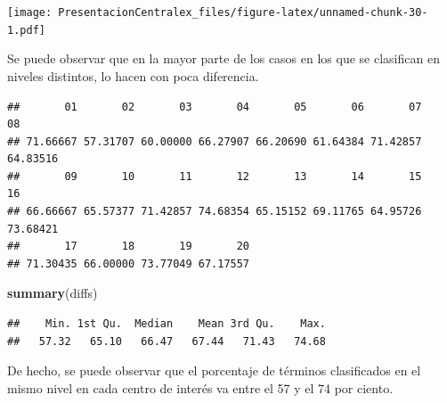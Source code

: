 \documentclass[
]{article}
\newenvironment{Shaded}{\begin{snugshade}}{\end{snugshade}}
\newcommand{\DecValTok}[1]{\textcolor[rgb]{0.00,0.00,0.81}{#1}}
\newcommand{\KeywordTok}[1]{\textcolor[rgb]{0.13,0.29,0.53}{\textbf{#1}}}
\newcommand{\NormalTok}[1]{#1}
\newcommand{\OperatorTok}[1]{\textcolor[rgb]{0.81,0.36,0.00}{\textbf{#1}}}
\newcommand{\StringTok}[1]{\textcolor[rgb]{0.31,0.60,0.02}{#1}}
\begin{document}
\texttt{[image: PresentacionCentralex\_files/figure-latex/unnamed-chunk-30-1.pdf]}

Se puede observar que en la mayor parte de los casos en los que se
clasifican en niveles distintos, lo hacen con poca diferencia.

\begin{Shaded}
\end{Shaded}

\begin{verbatim}
##       01       02       03       04       05       06       07       08 
## 71.66667 57.31707 60.00000 66.27907 66.20690 61.64384 71.42857 64.83516 
##       09       10       11       12       13       14       15       16 
## 66.66667 65.57377 71.42857 74.68354 65.15152 69.11765 64.95726 73.68421 
##       17       18       19       20 
## 71.30435 66.00000 73.77049 67.17557
\end{verbatim}

\begin{Shaded}
\begin{Highlighting}[]
\KeywordTok{summary}\NormalTok{(diffs)}
\end{Highlighting}
\end{Shaded}

\begin{verbatim}
##    Min. 1st Qu.  Median    Mean 3rd Qu.    Max. 
##   57.32   65.10   66.47   67.44   71.43   74.68
\end{verbatim}

De hecho, se puede observar que el porcentaje de términos clasificados
en el mismo nivel en cada centro de interés va entre el 57 y el 74 por
ciento.
\end{document}
